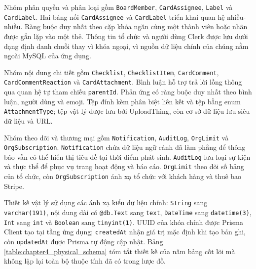 \documentclass[../DoAn.tex]{subfiles}
\begin{document}
Nhóm phân quyền và phân loại gồm \texttt{BoardMember}, \texttt{CardAssignee}, \texttt{Label} và \texttt{CardLabel}. Hai bảng nối \texttt{CardAssignee} và \texttt{CardLabel} triển khai quan hệ nhiều-nhiều. Ràng buộc duy nhất theo cặp khóa ngăn cùng một thành viên hoặc nhãn được gắn lặp vào một thẻ. Thông tin tổ chức và người dùng Clerk được lưu dưới dạng định danh chuỗi thay vì khóa ngoại, vì nguồn dữ liệu chính của chúng nằm ngoài MySQL của ứng dụng.

Nhóm nội dung chi tiết gồm \texttt{Checklist}, \texttt{ChecklistItem}, \texttt{CardComment}, \texttt{CardCommentReaction} và \texttt{CardAttachment}. Bình luận hỗ trợ trả lời lồng thông qua quan hệ tự tham chiếu \texttt{parentId}. Phản ứng có ràng buộc duy nhất theo bình luận, người dùng và emoji. Tệp đính kèm phân biệt liên kết và tệp bằng enum \texttt{AttachmentType}; tệp vật lý được lưu bởi UploadThing, còn cơ sở dữ liệu lưu siêu dữ liệu và URL.

Nhóm theo dõi và thương mại gồm \texttt{Notification}, \texttt{AuditLog}, \texttt{OrgLimit} và \texttt{OrgSubscription}. \texttt{Notification} chứa dữ liệu ngữ cảnh đã làm phẳng để thông báo vẫn có thể hiển thị tiêu đề tại thời điểm phát sinh. \texttt{AuditLog} lưu loại sự kiện và thực thể để phục vụ trang hoạt động và báo cáo. \texttt{OrgLimit} theo dõi số bảng của tổ chức, còn \texttt{OrgSubscription} ánh xạ tổ chức với khách hàng và thuê bao Stripe.

Thiết kế vật lý sử dụng các ánh xạ kiểu dữ liệu chính: \texttt{String} sang \texttt{varchar(191)}, nội dung dài có \texttt{@db.Text} sang \texttt{text}, \texttt{DateTime} sang \texttt{datetime(3)}, \texttt{Int} sang \texttt{int} và \texttt{Boolean} sang \texttt{tinyint(1)}. UUID của khóa chính được Prisma Client tạo tại tầng ứng dụng; \texttt{createdAt} nhận giá trị mặc định khi tạo bản ghi, còn \texttt{updatedAt} được Prisma tự động cập nhật. Bảng \ref{table:chapter4_physical_schema} tóm tắt thiết kế của năm bảng cốt lõi mà không lặp lại toàn bộ thuộc tính đã có trong lược đồ.
\end{document}
